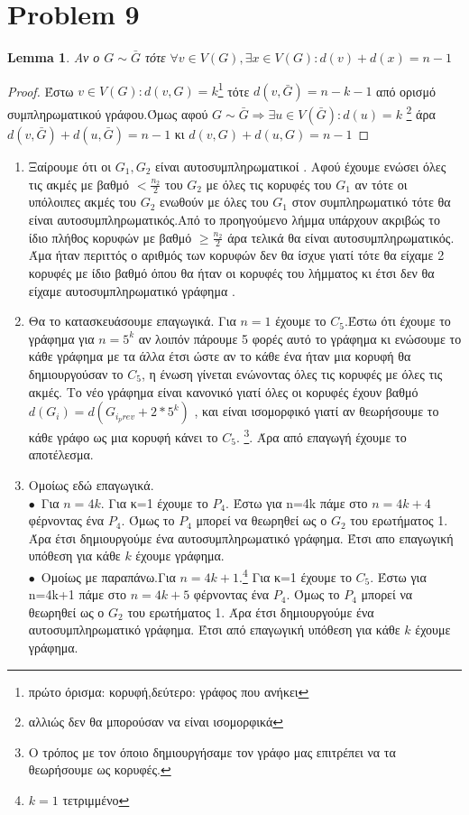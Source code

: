 \documentclass{article}
\newtheorem{lemma}{Lemma}
\begin{document}
\section*{Problem 9}
\begin{lemma}
Αν ο $G\sim\bar{G}$ τότε $\forall v\in V(G), \exists x\in V(G):d(v)+d(x)=n-1 $
\end{lemma}
\begin{proof}
	Έστω $v\in V(G):d(v,G)=k$\footnote{πρώτο όρισμα: κορυφή,δεύτερο: γράφος που ανήκει} τότε $d(v,\bar{G})=n-k-1$ από ορισμό συμπληρωματικού γράφου.Όμως αφού $G\sim \bar{G}\Rightarrow \exists u\in V(\bar{G}):d(u)=k$ \footnote{αλλιώς δεν θα μπορούσαν να είναι ισομορφικά} άρα $d(v,\bar{G})+d(u,\bar{G})=n-1$ κι $d(v,G)+d(u,G)=n-1$
\end{proof}
\begin{enumerate}
\item[1]
Ξαίρουμε ότι οι $G_1,G_2$ είναι αυτοσυμπληρωματικοί . Αφού έχουμε ενώσει όλες τις ακμές  με βαθμό $< \frac{n_2}{2}$ του $G_2$ με όλες τις κορυφές του $G_1$ αν τότε οι υπόλοιπες ακμές του $G_2$ ενωθούν με όλες του $G_1$ στον συμπληρωματικό τότε θα είναι αυτοσυμπληρωματικός.Από το προηγούμενο λήμμα υπάρχουν ακριβώς το ίδιο πλήθος κορυφών με βαθμό  $\ge \frac{n_2}{2}$ άρα τελικά θα είναι αυτοσυμπληρωματικός. Άμα ήταν περιττός ο αριθμός των κορυφών δεν θα ίσχυε γιατί τότε θα είχαμε 2 κορυφές με ίδιο βαθμό όπου θα ήταν οι κορυφές του λήμματος κι έτσι δεν θα είχαμε αυτοσυμπληρωματικό γράφημα .
\item[2]
Θα το κατασκευάσουμε επαγωγικά. Για $n=1$ έχουμε το $C_5$.Έστω ότι έχουμε το γράφημα για $n=5^k$ αν λοιπόν πάρουμε 5 φορές αυτό το γράφημα κι ενώσουμε το κάθε γράφημα με τα άλλα έτσι ώστε αν το κάθε ένα ήταν μια κορυφή θα δημιουργούσαν το $C_5$, η ένωση γίνεται ενώνοντας όλες τις κορυφές με όλες τις ακμές. Το νέο γράφημα είναι κανονικό γιατί όλες οι κορυφές έχουν βαθμό$d(G_i)=d(G_{i_prev}+2*5^k)$ , και είναι ισομορφικό γιατί αν θεωρήσουμε το κάθε γράφο ως μια κορυφή κάνει το  $C_5$. \footnote{Ο τρόπος με τον όποιο δημιουργήσαμε τον γράφο μας επιτρέπει να τα θεωρήσουμε ως κορυφές.}. Άρα από επαγωγή έχουμε το αποτέλεσμα.
\item[3]
Ομοίως εδώ επαγωγικά.\\ 
$\bullet$\ Για $n=4k$. Για κ=1 έχουμε το $P_4$. Έστω για n=4k πάμε στο $n=4k+4 $ φέρνοντας ένα $P_4$. Όμως το $P_4$ μπορεί να θεωρηθεί ως ο $G_2$ του ερωτήματος 1. Άρα έτσι δημιουργούμε ένα αυτοσυμπληρωματικό γράφημα. Έτσι απο επαγωγική υπόθεση για κάθε $k$ έχουμε γράφημα.
\\ $\bullet$\ Ομοίως με παραπάνω.Για $n=4k+1$.\footnote{$k=1$ τετριμμένο}  Για κ=1 έχουμε το $C_5$. Έστω για n=4k+1 πάμε στο $n=4k+5 $ φέρνοντας ένα $P_4$. Όμως το $P_4$ μπορεί να θεωρηθεί ως ο $G_2$ του ερωτήματος 1. Άρα έτσι δημιουργούμε ένα αυτοσυμπληρωματικό γράφημα. Έτσι από επαγωγική υπόθεση για κάθε $k$ έχουμε γράφημα. 
\end{enumerate}
\end{document}
